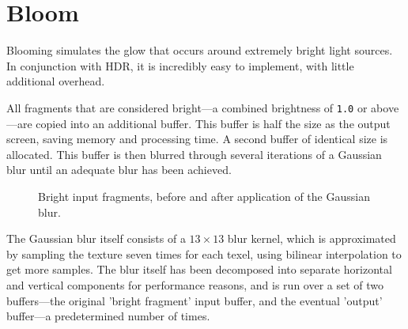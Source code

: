 \documentclass[11pt, oneside]{report}
\begin{document}
\section{Bloom}
Blooming simulates the glow that occurs around extremely bright light sources. In conjunction with \gls{HDR}, it is incredibly easy to implement, with little additional overhead.

All fragments that are considered bright---a combined brightness of \texttt{1.0} or above---are copied into an additional buffer. This buffer is half the size as the output screen, saving memory and processing time. A second buffer of identical size is allocated. This buffer is then blurred through several iterations of a Gaussian blur until an adequate blur has been achieved.

\begin{figure}[!htbp]
  \centering
  \hfill
  \caption{Bright input fragments, before and after application of the Gaussian blur.}
\end{figure}

The Gaussian blur itself consists of a $13 \times 13$ blur kernel, which is approximated by sampling the texture seven times for each \gls{texel}, using bilinear interpolation to get more samples. The blur itself has been decomposed into separate horizontal and vertical components for performance reasons, and is run over a set of two buffers---the original 'bright fragment' input buffer, and the eventual 'output' buffer---a predetermined number of times.
\end{document}
